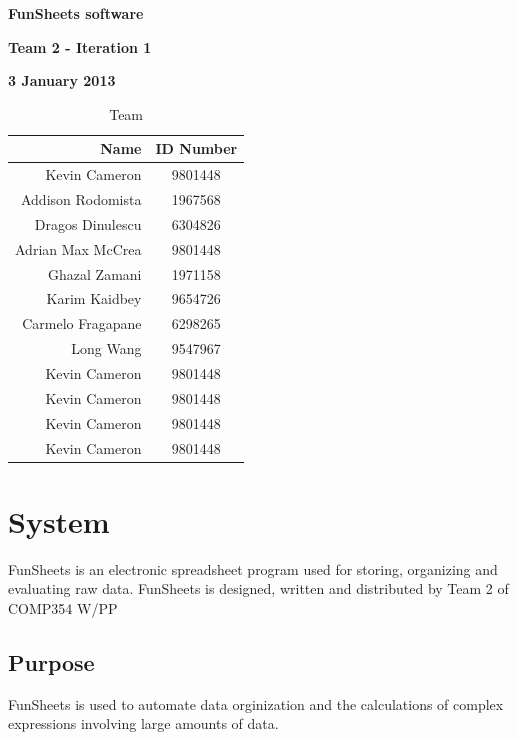 \documentclass[12pt]{article}
\begin{document}
\vspace*{0.5in}
\centerline{\bf\Large FunSheets software}

\vspace*{0.5in}
\centerline{\bf\Large Team 2 - Iteration 1}

\vspace*{0.5in}
\centerline{\bf\Large 3 January 2013}

\vspace*{1.5in}
\begin{table}[htbp]
\caption{Team}
\begin{center}
\begin{tabular}{|r | c|}
\hline
Name & ID Number \\\hline\hline
Kevin Cameron & 9801448 \\\hline\hline
Addison Rodomista & 1967568 \\\hline\hline
Dragos Dinulescu & 6304826 \\\hline\hline
Adrian Max McCrea & 9801448 \\\hline\hline
Ghazal Zamani & 1971158 \\\hline\hline
Karim Kaidbey & 9654726 \\\hline\hline
Carmelo Fragapane & 6298265 \\\hline\hline
Long Wang & 9547967 \\\hline\hline
Kevin Cameron & 9801448 \\\hline\hline
Kevin Cameron & 9801448 \\\hline\hline
Kevin Cameron & 9801448 \\\hline\hline
Kevin Cameron & 9801448 \\\hline
\end{tabular}
\end{center}
\end{table}

\clearpage

\section{System}
FunSheets is an electronic spreadsheet program used for storing, organizing and evaluating raw data. FunSheets is designed, written and distributed by Team 2 of COMP354 W/PP

\subsection{Purpose}
FunSheets is used to automate data orginization and the calculations of complex expressions involving large amounts of data.
\end{document}
